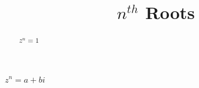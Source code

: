 \documentclass{ximera}
\title{$n^{th}$ Roots}
\begin{document}
\begin{abstract}
$z^n = 1$
\end{abstract}
\maketitle








$z^n = a + b i$
\end{document}
